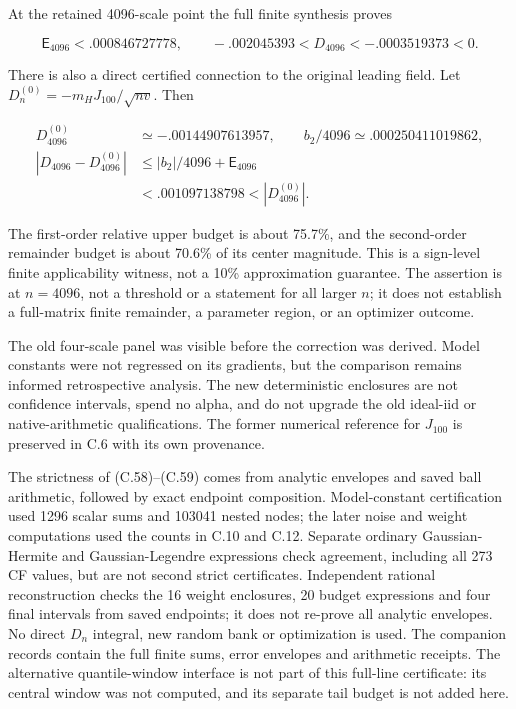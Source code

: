 \documentclass{article}
\begin{document}
At the retained 4096-scale point the full finite synthesis proves

\[
\mathsf E_{4096}<.000846727778,\qquad
-.002045393<D_{4096}<-.0003519373<0.
\tag{C.58}
\]

There is also a direct certified connection to the original leading
field. Let \(D_n^{(0)}=-m_HJ_{100}/\sqrt{nv}\). Then

\[
\begin{aligned}
D_{4096}^{(0)}&\simeq-.00144907613957,\qquad b_2/4096\simeq.000250411019862,\\
|D_{4096}-D_{4096}^{(0)}|
&\le |b_2|/4096+\mathsf E_{4096}\\
&<.001097138798<|D_{4096}^{(0)}|.
\end{aligned}
\tag{C.59}
\]

The first-order relative upper budget is about 75.7\%, and the
second-order remainder budget is about 70.6\% of its center magnitude.
This is a sign-level finite applicability witness, not a 10\%
approximation guarantee. The assertion is at \(n=4096\), not a threshold
or a statement for all larger \(n\); it does not establish a full-matrix
finite remainder, a parameter region, or an optimizer outcome.

The old four-scale panel was visible before the correction was derived.
Model constants were not regressed on its gradients, but the comparison
remains informed retrospective analysis. The new deterministic
enclosures are not confidence intervals, spend no alpha, and do not
upgrade the old ideal-iid or native-arithmetic qualifications. The
former numerical reference for \(J_{100}\) is preserved in C.6 with its
own provenance.

The strictness of (C.58)--(C.59) comes from analytic envelopes and saved
ball arithmetic, followed by exact endpoint composition. Model-constant
certification used 1296 scalar sums and 103041 nested nodes; the later
noise and weight computations used the counts in C.10 and C.12. Separate
ordinary Gaussian-Hermite and Gaussian-Legendre expressions check
agreement, including all 273 CF values, but are not second strict
certificates. Independent rational reconstruction checks the 16 weight
enclosures, 20 budget expressions and four final intervals from saved
endpoints; it does not re-prove all analytic envelopes. No direct
\(D_n\) integral, new random bank or optimization is used. The companion
records contain the full finite sums, error envelopes and arithmetic
receipts. The alternative quantile-window interface is not part of this
full-line certificate: its central window was not computed, and its
separate tail budget is not added here.
\end{document}
